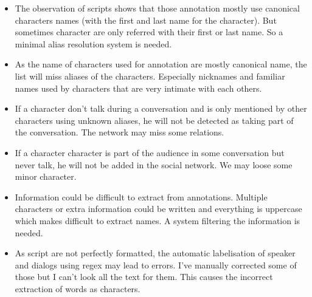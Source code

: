 \documentclass[a4paper, 12pt]{report}
\begin{document}
\begin{itemize}
\item 
 The observation of scripts shows that those annotation mostly use canonical characters names (with the first and last name for the character). But sometimes character are only referred with their first or last name. So a minimal alias resolution system is needed. 
\item
As the name of characters used for annotation are mostly canonical name, the list will miss aliases of the characters. Especially nicknames and familiar names used by characters that are very intimate with each others.
\item If a character don't talk during a conversation and is only mentioned by other characters using unknown aliases, he will not be detected as taking part of the conversation. The network may miss some relations.
\item 
If a character character is part of the audience in some conversation but never talk, he will not be added in the social network. We may loose some minor character.
\item Information could be difficult to extract from annotations. Multiple characters or extra information could be written and everything is uppercase which makes difficult to extract names.  A system filtering the information is needed.
\item As script are not perfectly formatted, the automatic labelisation of speaker and dialogs using regex may lead to errors. I've manually corrected some of those but I can't look all the text for them. This causes the incorrect extraction of words as characters. 
\end{itemize}
\end{document}
